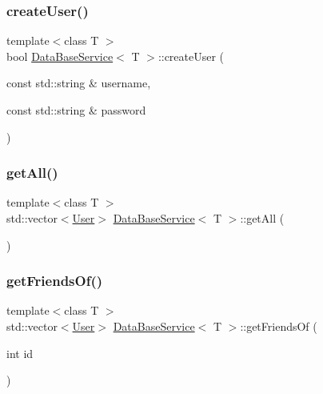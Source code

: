 \subsubsection{\texorpdfstring{create\+User()}{createUser()}}
{\footnotesize\ttfamily template$<$class T $>$ \\
bool \mbox{\hyperlink{classDataBaseService}{Data\+Base\+Service}}$<$ T $>$\+::create\+User (\begin{DoxyParamCaption}\item[{const std\+::string \&}]{username,  }\item[{const std\+::string \&}]{password }\end{DoxyParamCaption})\hspace{0.3cm}{\ttfamily [inline]}}

\mbox{\label{classDataBaseService_a1226c799e69e1417202366d4c2f7137d}} 
\subsubsection{\texorpdfstring{get\+All()}{getAll()}}
{\footnotesize\ttfamily template$<$class T $>$ \\
std\+::vector$<$\mbox{\hyperlink{structUser}{User}}$>$ \mbox{\hyperlink{classDataBaseService}{Data\+Base\+Service}}$<$ T $>$\+::get\+All (\begin{DoxyParamCaption}{ }\end{DoxyParamCaption})\hspace{0.3cm}{\ttfamily [inline]}}

\mbox{\label{classDataBaseService_ac82ba94d3e80ccc2f576b14bf71c8c2e}} 
\subsubsection{\texorpdfstring{get\+Friends\+Of()}{getFriendsOf()}\hspace{0.1cm}{\footnotesize\ttfamily [1/2]}}
{\footnotesize\ttfamily template$<$class T $>$ \\
std\+::vector$<$\mbox{\hyperlink{structUser}{User}}$>$ \mbox{\hyperlink{classDataBaseService}{Data\+Base\+Service}}$<$ T $>$\+::get\+Friends\+Of (\begin{DoxyParamCaption}\item[{int}]{id }\end{DoxyParamCaption})\hspace{0.3cm}{\ttfamily [inline]}}

